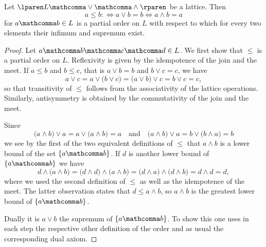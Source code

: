\medskip

\begin{proposition}
\label{prop:lattice_order}
  Let
  $\lparen L \mathcomma \vee \mathcomma \wedge \rparen$
  be a lattice.
  Then
  \[
    a \leq b
    \mathcolon \Leftrightarrow
    a \vee b \equal b
    \Leftrightarrow
    a \wedge b \equal a
  \]
  for
  $a \mathcomma b \in L$
  is a partial order on $L$
  with respect to which for every two elements their infimum and supremum exist.
\end{proposition}

\begin{proof}
  Let $a \mathcomma b \mathcomma c \mathcomma d \in L$.
  We first show that $\leq$ is a partial order on $L$.
  Reflexivity is given by the idempotence of the join and the meet.
  If $a \leq b$ and $b \leq c$,
  that is $a \vee b \equal b$ and $b \vee c \equal c$,
  we have
  \[
    a \vee c
    \equal
    a \vee \lparen b \vee c \rparen
    \equal
    \lparen a \vee b \rparen \vee c
    \equal
    b \vee c
    \equal
    c,
  \]
  so that transitivity of $\leq$
  follows from the associativity of the lattice operations.
  Similarly, antisymmetry is obtained by
  the commutativity of the join and the meet.

  Since
  \[
    \lparen a \wedge b \rparen \vee a
    \equal
    a \vee \lparen a \wedge b \rparen
    \equal
    a
    \quad \text{and} \quad
    \lparen a \wedge b \rparen \vee a
    \equal
    b \vee \lparen b \wedge a \rparen
    \equal
    b
  \]
  we see  by the first of the two equivalent definitions of $\leq$
  that $a \wedge b$ is a lower bound of the set
  $\lbrace a \mathcomma b \rbrace$.
  If $d$ is another lower bound of
  $\lbrace a \mathcomma b \rbrace$
  we have
  \[
    d \wedge \lparen a \wedge b \rparen
    \equal
    \lparen d \wedge d \rparen \wedge \lparen a \wedge b \rparen
    \equal
    \lparen d \wedge a \rparen \wedge \lparen d \wedge b \rparen
    \equal
    d \wedge d
    \equal
    d,
  \]
  where we used the second definition of $\leq$
  as well as the idempotence of the meet.
  The latter observation states that $d \leq a \wedge b$,
  so $a \wedge b$ is the greatest lower bound of
  $\lbrace a \mathcomma b \rbrace$.

  Dually it is $a \vee b$ the supremum of
  $\lbrace a \mathcomma b \rbrace$.
  To show this one uses in each step
  the respective other definition of the order
  and as usual the corresponding dual axiom.
\end{proof}

\medskip

